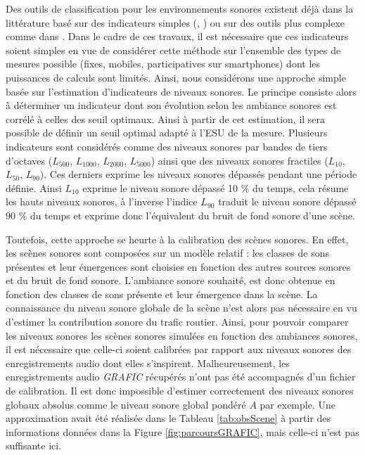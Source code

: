 Des outils de classification pour les environnements sonores existent déjà dans la littérature basé sur des indicateurs simples (\cite{can_describing_2015}, \cite{rychtarikova2013soundscape}) ou sur des outils plus complexe comme dans \cite{salamon2015unsupervised}.
Dans le cadre de ces travaux, il est nécessaire que ces indicateurs soient simples en vue de considérer cette méthode sur l'ensemble des types de mesures possible (fixes, mobiles, participatives sur smartphones) dont les puissances de calculs sont limités. Ainsi, nous considérons une approche simple basée sur l'estimation d'indicateurs de niveaux sonores.
Le principe consiste alors à déterminer un indicateur dont son évolution selon les ambiance sonores est corrélé à celles des seuil optimaux. Ainsi à partir de cet estimation, il sera possible de définir un seuil optimal adapté à l'ESU de la mesure.
Plusieurs indicateurs sont considérés comme des niveaux sonores par bandes de tiers d'octaves ($L_{500}$, $L_{1000}$, $L_{2000}$, $L_{5000}$) ainsi que des niveaux sonores fractiles ($L_{10}$, $L_{50}$, $L_{90}$). Ces derniers exprime les niveaux sonores dépassés pendant une période définie. Ainsi $L_{10}$ exprime le niveau sonore dépassé 10 $\%$ du temps, cela résume les hauts niveaux sonores, à l'inverse l'indice $L_{90}$ traduit le niveau sonore dépassé 90 $\%$ du temps et exprime donc l'équivalent du bruit de fond sonore d'une scène.

Toutefois, cette approche se heurte à la calibration des scènes sonores. En effet, les scènes sonores sont composées sur un modèle relatif : les classes de sons présentes et leur émergences sont choisies en fonction des autres sources sonores et du bruit de fond sonore. L'ambiance sonore souhaité, est donc obtenue en fonction des classes de sons présente et leur émergence dans la scène. La connaissance du niveau sonore globale de la scène n'est alors pas nécessaire en vu d'estimer la contribution sonore du trafic routier.
Ainsi, pour pouvoir comparer les niveaux sonores les scènes sonores simulées en fonction des ambiances sonores, il est nécessaire que celle-ci soient calibrées par rapport aux niveaux sonores des enregistrements audio dont elles s'inspirent. Malheureusement, les enregistrements audio \textit{GRAFIC} récupérés n'ont pas été accompagnés d'un fichier de calibration. Il est donc impossible d'estimer correctement des niveaux sonores globaux absolus comme le niveau sonore global pondéré $A$ par exemple. Une approximation avait été réalisée dans le Tableau \ref{tab:obsScene} à partir des informations données dans la Figure \ref{fig:parcoursGRAFIC}, mais celle-ci n'est pas suffisante ici.

